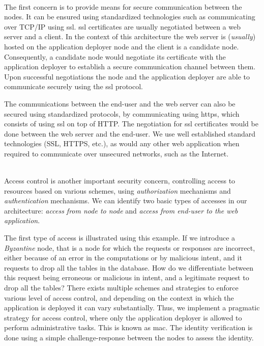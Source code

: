\documentclass[12pt, titlepage]{uo_temp}
\begin{document}
     \\ The first concern is to provide means for secure communication between the
     nodes. It can be ensured using standardized technologies such as communicating over
     TCP/IP using \gls{ssl}. \gls{ssl} certificates are usually negotiated between a web
     server and a client. In the context of this architecture the web server is
     (\emph{usually}) hosted on the application deployer node and the client is a
     candidate node. Consequently, a candidate node would negotiate its certificate with
     the application deployer to establish a secure communication channel between
     them. Upon successful negotiations the node and the application deployer are able
     to communicate securely using the \gls{ssl} protocol.

     The communications between the end-user and the web server can also be secured using
     standardized protocols, by communicating using \gls{https}, which consists of using
     \gls{ssl} on top of HTTP. The negotiation for \gls{ssl} certificates would be done
     between the web server and the end-user. We use well established standard
     technologies (SSL, HTTPS, etc.), as would any other web application when
     required to communicate over unsecured networks, such as the Internet.

     \\ Access control is another important security concern, controlling access to
     resources based on various schemes, using \emph{authorization} mechanisms and
     \emph{authentication} mechanisms. We can identify two basic types of accesses in our
     architecture: \emph{access from node to node} and \emph{access from end-user to the
       web application}.

     The first type of access is illustrated using this example. If we introduce a
     \emph{Byzantine} node, that is a node for which the requests or responses are
     incorrect, either because of an error in the computations or by malicious intent, and
     it requests to drop all the tables in the database. How do we differentiate between
     this request being erroneous or malicious in intent, and a legitimate request to drop
     all the tables? There exists multiple schemes and strategies to enforce various level
     of access control, and depending on the context in which the application is deployed
     it can vary substantially. Thus, we implement a pragmatic strategy for access
     control, where only the application deployer is allowed to perform administrative
     tasks. This is known as \gls{mac}. The identity verification is done using a simple
     challenge-response between the nodes to assess the identity.
     
\end{document}
